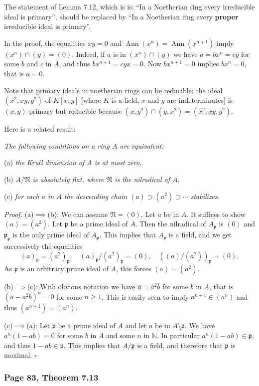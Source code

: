 \documentclass[12pt,letterpaper]{article}%
\newcommand{\oo}{\operatorname}\newcommand{\ooo}{\operatorname*}
\newcommand{\mf}{\mathfrak}
\newcommand{\ppp}{\mf p}
\newcommand{\NNN}{\mf N}\newcommand{\RRR}{\mf R}
\newcommand{\nn}{\noindent}
\begin{document}
The statement of Lemma 7.12, which is is: ``In a Noetherian ring every irreducible ideal is primary'', should be replaced by ``In a Noetherian ring every \textbf{proper} irreducible ideal is primary''.

In the proof, the equalities $xy=0$ and $\oo{Ann}(x^n)=\oo{Ann}(x^{n+1})$ imply $(x^n)\cap(y)=(0)$. Indeed, if $a$ is in $(x^n)\cap(y)$ we have $a=bx^n=cy$ for some $b$ and $c$ in $A$, and thus $bx^{n+1}=cyx=0$. Now $bx^{n+1}=0$ implies $bx^n=0$, that is $a=0$. 

Note that primary ideals in noetherian rings can be reducible: the ideal $(x^2,xy,y^2)$ of $K[x,y]$ [where $K$ is a field, $x$ and $y$ are indeterminates] is $(x,y)$-primary but reducible because $(x,y^2)\cap(y,x^2)=(x^2,xy,y^2)$.%

Here is a related result:

\nn\emph{The following conditions on a ring $A$ are equivalent:}

\nn(a) \emph{the Krull dimension of $A$ is at most zero,}

\nn(b) \emph{$A/\NNN$ is absolutely flat, where $\NNN$ is the nilradical of $A$,}

\nn(c) \emph{for each $a$ in $A$ the descending chain $(a)\supset(a^2)\supset\cdots$ stabilizes.}

\nn\emph{Proof.} (a)$\implies$(b): We can assume $\NNN=(0)$. Let $a$ be in $A$. It suffices to show $(a)=(a^2)$. Let $\ppp$ be a prime ideal of $A$. Then the nilradical of $A_\ppp$ is $(0)$ and $\ppp_\ppp$ is the only prime ideal of $A_\ppp$. This implies that $A_\ppp$ is a field, and we get successively the equalities 
$$
(a)_\ppp=(a^2)_\ppp,\quad(a)_\ppp/(a^2)_\ppp=(0),\quad((a)/(a^2))_\ppp=(0).
$$ 
As $\ppp$ is an arbitrary prime ideal of $A$, this forces $(a)=(a^2)$.

\nn(b)$\implies$(c): With obvious notation we have $\overline a=\overline a^2\overline b$ for some $b$ in $A$, that is $(a-a^2b)^n=0$ for some $n\ge1$. This is easily seen to imply $a^{n+1}\in(a^n)$ and thus $(a^{n+1})=(a^n)$. 

\nn(c)$\implies$(a): Let $\ppp$ be a prime ideal of $A$ and let $a$ be in $A\setminus\ppp$. We have $a^n(1-ab)=0$ for some $b$ in $A$ and some $n$ in $\mathbb N$. In particular $a^n(1-ab)\in\ppp$, and thus $1-ab\in\ppp$. This implies that $A/\ppp$ is a field, and therefore that $\ppp$ is maximal. $\square$

\subsubsection{Page 83, Theorem 7.13}%
\end{document}
